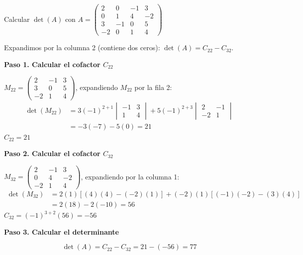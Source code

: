 \begin{example}
\label{ex:det4x4}
Calcular $\det(A)$ con $A = \begin{pmatrix}
2 & 0 & -1 & 3 \\
0 & 1 & 4 & -2 \\
3 & -1 & 0 & 5 \\
-2 & 0 & 1 & 4
\end{pmatrix}$

\begin{myproof}
Expandimos por la columna 2 (contiene dos ceros): $\det(A) = C_{22} - C_{32}$.

\textbf{Paso 1. Calcular el cofactor $C_{22}$}

$M_{22} = \begin{pmatrix} 2 & -1 & 3 \\ 3 & 0 & 5 \\ -2 & 1 & 4 \end{pmatrix}$, expandiendo $M_{22}$ por la fila 2:
\begin{align*}
\det(M_{22}) &= 3(-1)^{2+1} \begin{vmatrix} -1 & 3 \\ 1 & 4 \end{vmatrix} + 5(-1)^{2+3} \begin{vmatrix} 2 & -1 \\ -2 & 1 \end{vmatrix} \\
&= -3(-7) - 5(0) = 21
\end{align*}
$C_{22} = 21$

\textbf{Paso 2. Calcular el cofactor $C_{32}$}

$M_{32} = \begin{pmatrix} 2 & -1 & 3 \\ 0 & 4 & -2 \\ -2 & 1 & 4 \end{pmatrix}$, expandiendo por la columna 1:
\begin{align*}
\det(M_{32}) &= 2(1)[(4)(4)-(-2)(1)] + (-2)(1)[(-1)(-2)-(3)(4)] \\
&= 2(18) - 2(-10) = 56
\end{align*}
$C_{32} = (-1)^{3+2}(56) = -56$

\textbf{Paso 3. Calcular el determinante}

\[
\det(A) = C_{22} - C_{32} = 21 - (-56) = \boxed{77}
\]
\end{myproof}
\end{example}


